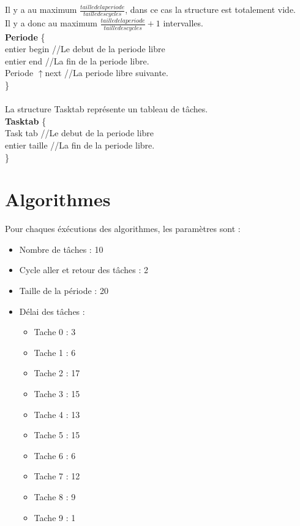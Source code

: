 \documentclass[11pt]{article}
\begin{document}
Il y a au maximum $\frac{taille de la periode}{taille des cycles}$, dans ce cas la structure est totalement vide.\\
Il y a donc au maximum $\frac{taille de la periode}{taille des cycles}+1$ intervalles.\\
\indent \textbf{Periode} \{ \\
    \indent \indent entier begin    \indent \indent//Le debut de la periode libre\\
    \indent \indent entier end \indent \indent //La fin de la periode libre.\\
    \indent \indent Periode $\uparrow$next \indent //La periode libre suivante.\\
\indent\}
\\\\
La structure Tasktab représente un tableau de tâches.\\
\indent \textbf{Tasktab} \{ \\
    \indent \indent Task tab    \indent \indent//Le debut de la periode libre\\
    \indent \indent entier taille \indent   //La fin de la periode libre.\\
\indent\}

\newpage
\section{Algorithmes}

Pour chaques éxécutions des algorithmes, les paramètres sont :
\begin{itemize}
    \item Nombre de tâches : 10
    \item Cycle aller et retour des tâches : 2
    \item Taille de la période : 20
    \item Délai des tâches :
    \begin{itemize}
        \item Tache 0 : 3
        \item Tache 1 : 6
        \item Tache 2 : 17
        \item Tache 3 : 15
        \item Tache 4 : 13
        \item Tache 5 : 15
        \item Tache 6 : 6
        \item Tache 7 : 12
        \item Tache 8 : 9
        \item Tache 9 : 1
    \end{itemize}
\end{itemize}
\vspace{1mm}
\end{document}
